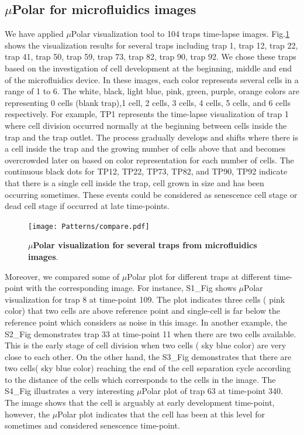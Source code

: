 \documentclass[conference]{IEEEtran}
\begin{document}
\subsection{$\mu$Polar for microfluidics images}

We have applied $\mu$Polar visualization tool to   104 traps time-lapse images. Fig.\ref{fig:compare} shows the  visualization results for several traps including trap 1, trap 12, trap 22, trap 41, trap 50, trap 59, trap 73, trap 82, trap 90, trap 92. We chose these traps based on the investigation of cell development at the beginning, middle and end of the microfluidics device. In these images, each color represents several cells in a range of 1 to 6. The white, black, light blue, pink, green, purple, orange colors are representing 0 cells (blank trap),1 cell, 2 cells, 3 cells, 4 cells, 5 cells, and 6 cells respectively. For example, TP1 represents the time-lapse visualization of trap 1 where cell division occurred normally at the beginning between cells inside the trap and the trap outlet.  The process gradually develops and shifts where there is a cell inside the trap and the growing number of cells above that and becomes overcrowded later on based on color representation for each number of cells. The continuous black dots for TP12, TP22, TP73, TP82, and TP90, TP92 indicate that there is a single cell inside the trap, cell grown in size and has been occurring sometimes. These events could be considered as senescence cell stage or dead cell stage if occurred at late time-points.

\begin{figure}
\centering
\texttt{[image: Patterns/compare.pdf]}
\caption{ \textbf{ $\mu$Polar visualization for several traps from microfluidics images}.}
\label{fig:compare}
\end{figure}


Moreover, we compared some of $\mu$Polar plot for different traps at different time-point with the corresponding image. For instance, S1\_Fig shows $\mu$Polar visualization for trap 8 at time-point 109. The plot indicates three cells ( pink color) that two cells are above reference point and single-cell is far below the reference point which considers as noise in this image. In another example, the S2\_Fig demonstrates trap 33 at time-point 11 when there are two cells available. This is the early stage of cell division when two cells ( sky blue color) are very close to each other. On the other hand, the S3\_Fig demonstrates that there are two cells( sky blue color) reaching the end of the cell separation cycle according to the distance of the cells which corresponds to the cells in the image. The S4\_Fig illustrates a very interesting $\mu$Polar plot of trap 63 at time-point 340. The image shows that the cell is arguably at early development time-point, however, the $\mu$Polar plot indicates that the cell has been at this level for sometimes and considered senescence time-point.  
\end{document}
